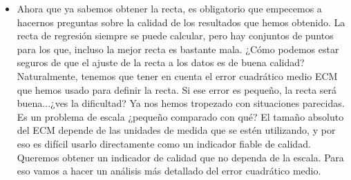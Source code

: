     \begin{itemize}

    \item Ahora que ya sabemos obtener la recta, es obligatorio que empecemos a hacernos preguntas sobre la calidad de los resultados que hemos obtenido. La recta de regresión siempre se puede calcular, pero hay conjuntos de puntos para los que, incluso la mejor recta es bastante mala. ¿Cómo podemos estar seguros de que el ajuste de la recta a los datos es de buena calidad? Naturalmente, tenemos que tener en cuenta el error cuadrático medio ECM que hemos usado para definir la recta. Si ese error es pequeño, la recta será buena...¿ves la dificultad?  Ya nos hemos tropezado con situaciones parecidas. Es un problema de escala ¿pequeño comparado con qué? El tamaño absoluto del ECM depende de las unidades de medida que se estén utilizando, y por eso es difícil usarlo directamente como un indicador fiable de calidad. Queremos obtener un indicador de calidad que no dependa de la escala. Para eso vamos a hacer un análisis más detallado del error cuadrático medio.


\end{itemize}
